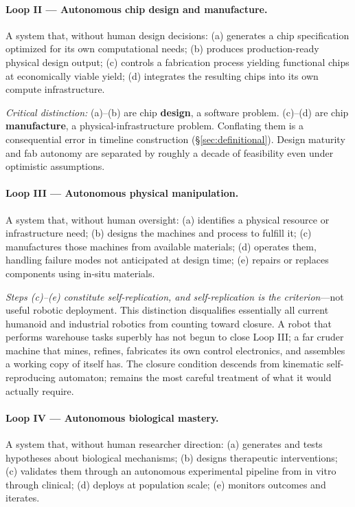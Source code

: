 \documentclass[11pt]{article}
\begin{document}
\paragraph{Loop II --- Autonomous chip design and manufacture.} A system that, without human design decisions: (a) generates a chip specification optimized for its own computational needs; (b) produces production-ready physical design output; (c) controls a fabrication process yielding functional chips at economically viable yield; (d) integrates the resulting chips into its own compute infrastructure.

\emph{Critical distinction:} (a)--(b) are chip \textbf{design}, a software problem. (c)--(d) are chip \textbf{manufacture}, a physical-infrastructure problem. Conflating them is a consequential error in timeline construction (\S\ref{sec:definitional}). Design maturity and fab autonomy are separated by roughly a decade of feasibility even under optimistic assumptions.

\paragraph{Loop III --- Autonomous physical manipulation.} A system that, without human oversight: (a) identifies a physical resource or infrastructure need; (b) designs the machines and process to fulfill it; (c) manufactures those machines from available materials; (d) operates them, handling failure modes not anticipated at design time; (e) repairs or replaces components using in-situ materials.

\emph{Steps (c)--(e) constitute self-replication, and self-replication is the criterion}---not useful robotic deployment. This distinction disqualifies essentially all current humanoid and industrial robotics from counting toward closure. A robot that performs warehouse tasks superbly has not begun to close Loop III; a far cruder machine that mines, refines, fabricates its own control electronics, and assembles a working copy of itself has. The closure condition descends from \citet{vonneumann1966} kinematic self-reproducing automaton; \citet{freitas2004} remains the most careful treatment of what it would actually require.

\paragraph{Loop IV --- Autonomous biological mastery.} A system that, without human researcher direction: (a) generates and tests hypotheses about biological mechanisms; (b) designs therapeutic interventions; (c) validates them through an autonomous experimental pipeline from in vitro through clinical; (d) deploys at population scale; (e) monitors outcomes and iterates.
\end{document}
